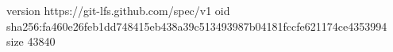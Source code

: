 version https://git-lfs.github.com/spec/v1
oid sha256:fa460e26feb1dd748415eb438a39c513493987b04181fccfe621174ce4353994
size 43840
